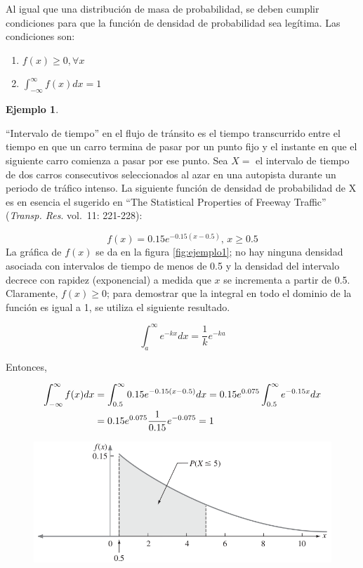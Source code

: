 \documentclass[
  11pt,
]{book}
\providecommand{\tightlist}{%
  \setlength{\itemsep}{0pt}\setlength{\parskip}{0pt}}
\theoremstyle{definition}
\theoremstyle{definition}
\newtheorem{example}{Ejemplo}[chapter]
\theoremstyle{definition}
\theoremstyle{definition}
\theoremstyle{remark}
\begin{document}
Al igual que una distribución de masa de probabilidad, se deben cumplir condiciones para que la función de densidad de probabilidad sea legítima. Las condiciones son:

\begin{enumerate}
\def\labelenumi{\arabic{enumi}.}
\tightlist
\item
  \(f(x) \geq 0, \forall x\)
\item
  \(\displaystyle\int_{-\infty}^{\infty} f(x)dx = 1\)
\end{enumerate}

\begin{example}
\protect\hypertarget{exm:intervalotiempo}{}\label{exm:intervalotiempo}

``Intervalo de tiempo'' en el flujo de tránsito es el tiempo transcurrido entre el tiempo en que un carro termina de pasar por un punto fijo y el instante en que el siguiente carro comienza a pasar por ese punto. Sea \(X =\) el intervalo de tiempo de dos carros consecutivos seleccionados al azar en una autopista durante un periodo de tráfico intenso. La siguiente función de densidad de probabilidad de X es en esencia el sugerido en ``The Statistical Properties of Freeway Traffic'' (\emph{Transp. Res}. vol.~11: 221-228):

\[f(x) = 0.15e^{-0.15(x-0.5)} \text{, } x \geq 0.5\]
La gráfica de \(f(x)\) se da en la figura \ref{fig:ejemplo1}; no hay ninguna densidad asociada con intervalos de tiempo de menos de 0.5 y la densidad del intervalo decrece con rapidez (exponencial) a medida que \(x\) se incrementa a partir de 0.5. Claramente, \(f(x) \geq 0\); para demostrar que la integral en todo el dominio de la función es igual a 1, se utiliza el siguiente resultado.

\[
\int_a^{\infty}e^{-kx}dx = \frac{1}{k}e^{-ka}
\]

Entonces,

\begin{equation}
\notag
\begin{split}
\int_{-\infty}^{\infty} f(x)dx &= \int_{0.5}^{\infty} 0.15e^{-0.15(x-0.5)}dx = 0.15e^{0.075}\int_{0.5}^{\infty} e^{-0.15x}dx\\
&= 0.15e^{0.075}\frac{1}{0.15}e^{-0.075} = 1
\end{split}
\end{equation}

\begin{figure}

{\centering \includegraphics[width=0.7\linewidth]{material/img/ejemplo1} 

}
\end{figure}
\end{example}
\end{document}
